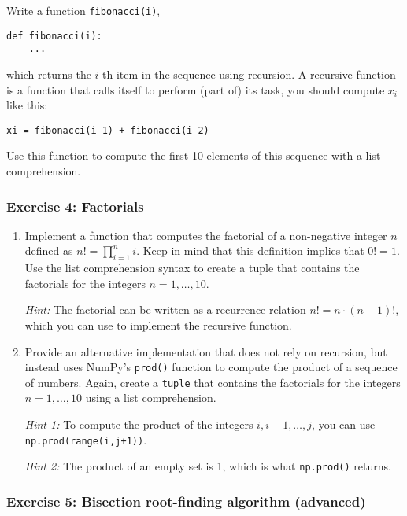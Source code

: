 \documentclass[10pt]{scrartcl}
\begin{document}
Write a function \texttt{fibonacci(i)},

\begin{verbatim}
def fibonacci(i):
    ...
\end{verbatim}

which returns the \(i\)-th item in the sequence using recursion. A
recursive function is a function that calls itself to perform (part of)
its task, \ie you should compute \(x_i\) like this:

\begin{verbatim}
xi = fibonacci(i-1) + fibonacci(i-2)
\end{verbatim}

Use this function to compute the first 10 elements of this sequence with
a list comprehension.

    \hypertarget{exercise-4-factorials}{%
\subsubsection{Exercise 4: Factorials}\label{exercise-4-factorials}}

\begin{enumerate}
\def\labelenumi{\arabic{enumi}.}
\item
  Implement a function that computes the factorial of a non-negative
  integer \(n\) defined as \(n! = \prod_{i=1}^n i\). Keep in mind that
  this definition implies that \(0! = 1\). Use the list comprehension
  syntax to create a tuple that contains the factorials for the integers
  \(n=1,\dots,10\).

  \emph{Hint:} The factorial can be written as a recurrence relation
  \(n! = n \cdot (n-1)!\), which you can use to implement the recursive
  function.
\item
  Provide an alternative implementation that does not rely on recursion,
  but instead uses NumPy's \texttt{prod()} function to compute the
  product of a sequence of numbers. Again, create a \texttt{tuple} that
  contains the factorials for the integers \(n=1,\dots,10\) using a list
  comprehension.

  \emph{Hint 1:} To compute the product of the integers
  \(i,i+1,\dots,j\), you can use \texttt{np.prod(range(i,j+1))}.

  \emph{Hint 2:} The product of an empty set is 1, which is what
  \texttt{np.prod()} returns.
\end{enumerate}

    \hypertarget{exercise-5-bisection-root-finding-algorithm-advanced}{%
\subsubsection{Exercise 5: Bisection root-finding algorithm
(advanced)}\label{exercise-5-bisection-root-finding-algorithm-advanced}}
\end{document}
